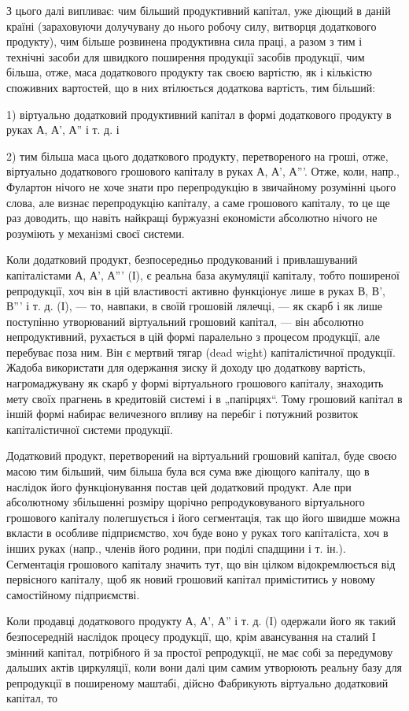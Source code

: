 З цього далі випливає: чим більший продуктивний капітал, уже
діющий в даній країні (зараховуючи долучувану до нього робочу силу,
витворця додаткового продукту), чим більше розвинена продуктивна сила
праці, а разом з тим і технічні засоби для швидкого поширення продукції
засобів продукції, чим більша, отже, маса додаткового продукту
так своєю вартістю, як і кількістю споживних вартостей, що в них
втілюється додаткова вартість, тим більший:

1) віртуально додатковий продуктивний капітал в формі додаткового
продукту в руках А, А', А'' і т. д. і

2) тим більша маса цього додаткового продукту, перетвореного на
гроші, отже, віртуально додаткового грошового капіталу в руках А, А', А'''.
Отже, коли, напр., Фулартон нічого не хоче знати про перепродукцію
в звичайному розумінні цього слова, але визнає перепродукцію капіталу,
а саме грошового капіталу, то це ще раз доводить, що навіть найкращі
буржуазні економісти абсолютно нічого не розуміють у механізмі своєї
системи.

Коли додатковий продукт, безпосередньо продукований і привлашуваний
капіталістами А, А', А''' (І), є реальна база акумуляції капіталу,
тобто поширеної репродукції, хоч він в цій властивості активно функціонує
лише в руках В, В', В''' і т. д. (І), — то, навпаки, в своїй грошовій
лялечці, — як скарб і як лише поступінно утворюваний віртуальний
грошовий капітал, — він абсолютно непродуктивний, рухається
в цій формі паралельно з процесом продукції, але перебуває поза ним.
Він є мертвий тягар (dead wight) капіталістичної продукції. Жадоба використати
для одержання зиску й доходу цю додаткову вартість, нагромаджувану
як скарб у формі віртуального грошового капіталу, знаходить
мету своїх прагнень в кредитовій системі і в „папірцях“. Тому грошовий
капітал в іншій формі набирає величезного впливу на перебіг і потужний
розвиток капіталістичної системи продукції.

Додатковий продукт, перетворений на віртуальний грошовий капітал,
буде своєю масою тим більший, чим більша була вся сума вже діющого
капіталу, що в наслідок його функціонування постав цей додатковий
продукт. Але при абсолютному збільшенні розміру щорічно репродуковуваного
віртуального грошового капіталу полегшується і його сегментація,
так що його швидше можна вкласти в особливе підприємство, хоч буде
воно у руках того капіталіста, хоч в інших руках (напр., членів його родини,
при поділі спадщини і т. ін.). Сегментація грошового капіталу значить
тут, що він цілком відокремлюється від первісного капіталу, щоб як
новий грошовий капітал приміститись у новому самостійному підприємстві.

Коли продавці додаткового продукту А, А', А'' і т. д. (І) одержали
його як такий безпосередній наслідок процесу продукції, що, крім авансування
на сталий І змінний капітал, потрібного й за простої репродукції,
не має собі за передумову дальших актів циркуляції, коли вони
далі цим самим утворюють реальну базу для репродукції в поширеному
маштабі, дійсно Фабрикують віртуально додатковий капітал, то
\parbreak{}  %
